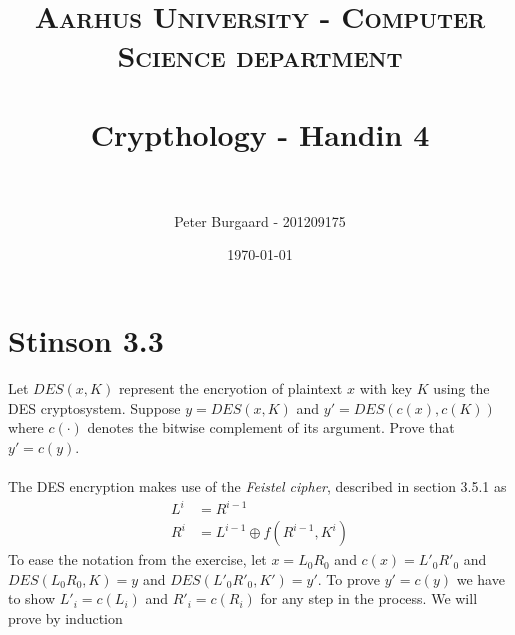 \documentclass[paper=a4, fontsize=11pt]{scrartcl} %
\title{	
	\normalfont \normalsize 
	\textsc{Aarhus University - Computer Science department} \\ [25pt] %
	\horrule{0.5pt} \\[0.4cm] %
	\huge Crypthology - Handin 4 \\ %
	\horrule{2pt} \\[0.5cm] %
}
\author{Peter Burgaard - 201209175} %
\date{\normalsize\today} %
\numberwithin{equation}{section} %
\numberwithin{figure}{section} %
\numberwithin{table}{section} %
\begin{document}
	
	\maketitle %
	
	\section{Stinson 3.3}
	Let $DES(x,K)$ represent the encryotion of plaintext $x$ with key $K$ using the DES cryptosystem. Suppose $y=DES(x,K)$ and $y'=DES(c(x),c(K))$ where $c(\cdot)$ denotes the bitwise complement of its argument. Prove that $y'=c(y)$.  \\ \\
	The DES encryption makes use of the \textit{Feistel cipher}, described in section 3.5.1 as
	\begin{align*}
		L^i &= R^{i-1} \\
		R^i &= L^{i-1}\oplus f(R^{i-1},K^i)
	\end{align*}
	To ease the notation from the exercise, let $x=L_0 R_0$ and $c(x)=L'_0 R'_0$ and $DES(L_0 R_0,K)=y$ and $DES(L'_0 R'_0, K')=y'$. To prove $y'=c(y)$ we have to show $L'_i=c(L_i)$ and $R'_i=c(R_i)$ for any step in the process. We will prove by induction
	
\end{document}
